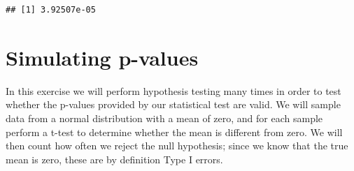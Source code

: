 \documentclass[12pt,]{book}
\newenvironment{Shaded}{\begin{snugshade}}{\end{snugshade}}
\newcommand{\CommentTok}[1]{\textcolor[rgb]{0.56,0.35,0.01}{\textit{#1}}}
\newcommand{\ControlFlowTok}[1]{\textcolor[rgb]{0.13,0.29,0.53}{\textbf{#1}}}
\newcommand{\DataTypeTok}[1]{\textcolor[rgb]{0.13,0.29,0.53}{#1}}
\newcommand{\DecValTok}[1]{\textcolor[rgb]{0.00,0.00,0.81}{#1}}
\newcommand{\KeywordTok}[1]{\textcolor[rgb]{0.13,0.29,0.53}{\textbf{#1}}}
\newcommand{\NormalTok}[1]{#1}
\newcommand{\OperatorTok}[1]{\textcolor[rgb]{0.81,0.36,0.00}{\textbf{#1}}}
\newcommand{\StringTok}[1]{\textcolor[rgb]{0.31,0.60,0.02}{#1}}
\begin{document}
\begin{verbatim}
## [1] 3.92507e-05
\end{verbatim}

\hypertarget{simulating-p-values}{%
\section{Simulating p-values}\label{simulating-p-values}}

In this exercise we will perform hypothesis testing many times in order to test whether the p-values provided by our statistical test are valid. We will sample data from a normal distribution with a mean of zero, and for each sample perform a t-test to determine whether the mean is different from zero. We will then count how often we reject the null hypothesis; since we know that the true mean is zero, these are by definition Type I errors.

\begin{Shaded}
\end{Shaded}
\end{document}
